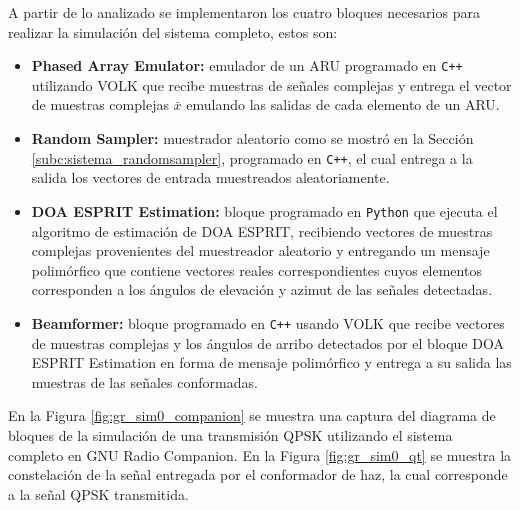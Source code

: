 A partir de lo analizado se implementaron los cuatro bloques necesarios para realizar la simulación del sistema completo, estos son:
\begin{itemize}
    \item \textbf{Phased Array Emulator:} emulador de un ARU programado en \texttt{C++} utilizando VOLK que recibe muestras de señales complejas y entrega el vector de muestras complejas $\bar{x}$ emulando las salidas de cada elemento de un ARU.
    \item \textbf{Random Sampler:} muestrador aleatorio como se mostró en la Sección \ref{subc:sistema_randomsampler}, programado en \texttt{C++}, el cual entrega a la salida los vectores de entrada muestreados aleatoriamente.
    \item \textbf{DOA ESPRIT Estimation:} bloque programado en \texttt{Python} que ejecuta el algoritmo de estimación de DOA ESPRIT, recibiendo vectores de muestras complejas provenientes del muestreador aleatorio y entregando un mensaje polimórfico que contiene vectores reales correspondientes cuyos elementos corresponden a los ángulos de elevación y azimut de las señales detectadas.
    \item \textbf{Beamformer:} bloque programado en \texttt{C++} usando VOLK que recibe vectores de muestras complejas y los ángulos de arribo detectados por el bloque DOA ESPRIT Estimation en forma de mensaje polimórfico y entrega a su salida las muestras de las señales conformadas.
\end{itemize}

En la Figura \ref{fig:gr_sim0_companion} se muestra una captura del diagrama de bloques de la simulación de una transmisión QPSK utilizando el sistema completo en GNU Radio Companion. En la Figura \ref{fig:gr_sim0_qt} se muestra la constelación de la señal entregada por el conformador de haz, la cual corresponde a la señal QPSK transmitida.

